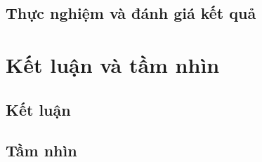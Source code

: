 \section{Thực nghiệm và đánh giá kết quả}
\label{sec:testbed}


\chapter{Kết luận và tầm nhìn}
\label{chap:KetLuan}

\section{Kết luận}


\section{Tầm nhìn}
